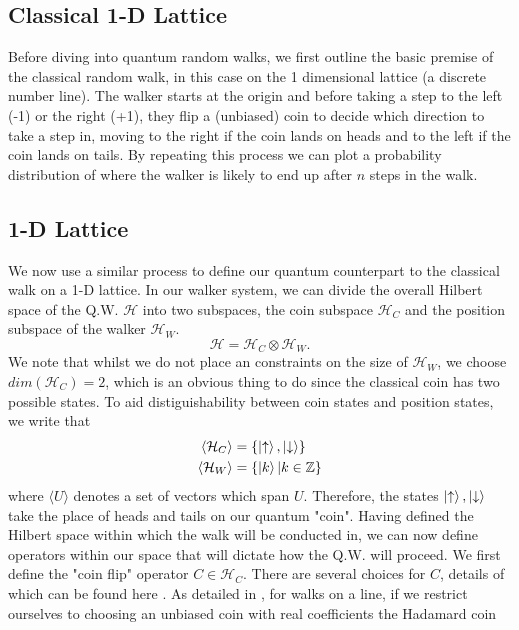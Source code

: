 \subsection{Classical 1-D Lattice}
Before diving into quantum random walks, we first outline the basic premise of the classical random walk, in this case on the 1 dimensional lattice (a discrete number line).
The walker starts at the origin and before taking a step to the left (-1) or the right (+1), they flip a (unbiased) coin to decide which direction to take a step in, moving to the right if the coin lands on heads and to the left if the coin lands on tails. 
By repeating this process we can plot a probability distribution of where the walker is likely to end up after $n$ steps in the walk.
\subsection{1-D Lattice}
We now use a similar process to define our quantum counterpart to the classical walk on a 1-D lattice. 
In our walker system, we can divide the overall Hilbert space of the Q.W. $\mathcal{H}$ into two subspaces, the coin subspace $\mathcal{H}_C$ and the position subspace of the walker $\mathcal{H}_W$. 
\begin{equation}
    \mathcal{H} = \mathcal{H}_C \otimes \mathcal{H}_W.
\end{equation}
We note that whilst we do not place an constraints on the size of $\mathcal{H}_W$, we choose $dim(\mathcal{H}_C) = 2$, which is an obvious thing to do since the classical coin has two possible states. 
To aid distiguishability between coin states and position states, we write that
\begin{align}
    \langle\mathcal{H}_C\rangle &= \{\ket{\uparrow}, \ket{\downarrow}\}\\
    \langle\mathcal{H}_W\rangle &= \{\ket{k} | k\in\mathbb{Z}\}
\end{align}
where $\langle U \rangle$ denotes a set of vectors which span $U$. 
Therefore, the states $\ket{\uparrow}, \ket{\downarrow}$ take the place of heads and tails on our quantum "coin". 
Having defined the Hilbert space within which the walk will be conducted in, we can now define operators within our space that will dictate how the Q.W. will proceed. We first define the "coin flip" operator $C\in \mathcal{H}_C$. 
There are several choices for $C$, details of which can be found here \cite{Tregenna2003}. 
As detailed in \cite{Tregenna2003}, for walks on a line, if we restrict ourselves to choosing an unbiased coin with real coefficients the Hadamard coin
